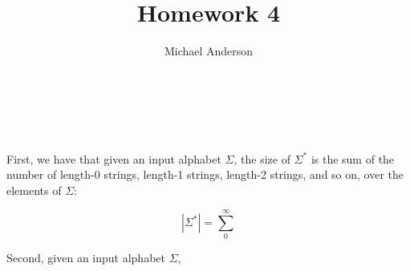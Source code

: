 \documentclass{article}
\author{Michael Anderson}
\title{Homework 4}
\begin{document}
\maketitle
{}
\\
\flushleft
\newpage

\section{}

\section{}

\section{}

\section{}
First, we have that given an input alphabet $\Sigma$, the size of $\Sigma^*$ is
the sum of the number of length-0 strings, length-1 strings, length-2 strings,
and so on, over the elements of $\Sigma$:

\[
|\Sigma^*| = \sum_0^{\infty} 
\]

Second, given an input alphabet $\Sigma$,
\end{document}
